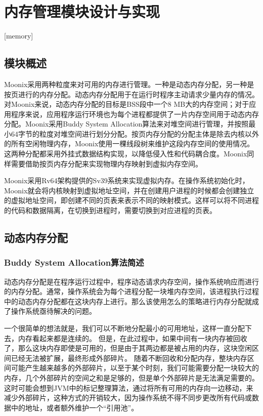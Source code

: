 
\chapter{内存管理模块设计与实现}[memory]
\label{chapter:memory}

\section{模块概述}

Moonix采用两种粒度来对可用的内存进行管理。一种是动态内存分配，另一种是按页进行的内存分配。动态内存分配用于在运行时程序主动请求少量内存的情况。对Moonix来说，动态内存分配的目标是BSS段中一个8 MB大的内存空间；对于应用程序来说，应用程序运行环境也为每个进程都提供了一片内存空间用于动态内存分配。Moonix采用Buddy System Allocation算法来对堆空间进行管理，并按照最小64字节的粒度对堆空间进行划分分配。按页内存分配的分配主体是除去内核以外的所有空闲物理内存，Moonix使用一棵线段树来维护这段内存空间的使用情况。这两种分配都采用外挂式数据结构实现，以降低侵入性和代码耦合度。Moonix同样需要借助按页内存分配来实现物理内存映射到虚拟内存空间。

Moonix采用Rv64架构提供的Sv39系统来实现虚拟内存。在操作系统初始化时，Moonix就会将内核映射到虚拟地址空间，并在创建用户进程的时候都会创建独立的虚拟地址空间，即创建不同的页表来表示不同的映射模式。这样可以将不同进程的代码和数据隔离，在切换到进程时，需要切换到对应进程的页表。

\section{动态内存分配}

\subsection{Buddy System Allocation算法简述}

动态内存分配是在程序运行过程中，程序动态请求内存空间，操作系统响应而进行的内存分配。通常，操作系统会为每个进程分配一块堆内存空间，该进程执行过程中的动态内存分配都在这块内存上进行。那么该使用怎么的策略进行内存分配就成了操作系统亟待解决的问题。

一个很简单的想法就是，我们可以不断地分配最小的可用地址，这样一直分配下去，内存看起来都是连续的。
但是，在此过程中，如果中间有一块内存被回收了，那么这块内存即使是可用的，但是由于其两边都是被占用的内存，这块空闲区间已经无法被扩展，最终形成外部碎片。
随着不断回收和分配内存，整块内存区间可能产生越来越多的外部碎片，以至于某个时刻，我们可能需要分配一块较大的内存，几个外部碎片的空间之和是足够的，但是单个外部碎片是无法满足需要的。这时可能会想到JVM中的标记整理算法，通过将所有可用的内存向一边移动，来减少外部碎片，这种方式的开销较大，因为操作系统不得不同步更改所有代码或数据中的地址，或者额外维护一个“引用池”。

